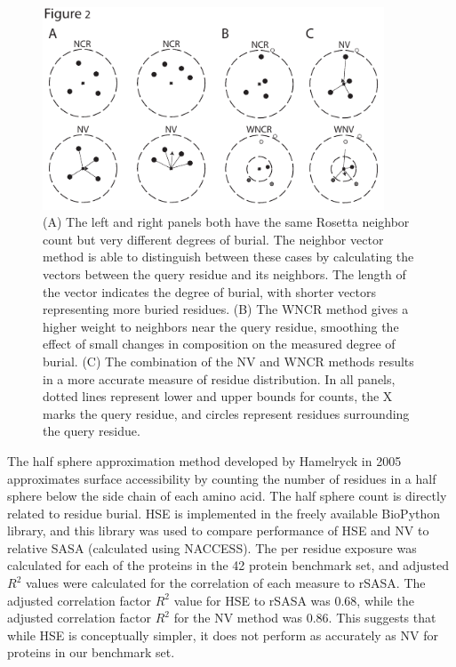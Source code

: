 \begin{figure}
\centering
\includegraphics[width=4in]{figures/nv_kbp/nv_schematic}
\caption{
(A) The left and right panels both have the same Rosetta neighbor count \citep{Dantas:2003vt} but very different degrees of burial.
The neighbor vector method is able to distinguish between these cases by calculating the vectors between the query residue and its neighbors.
The length of the vector indicates the degree of burial, with shorter vectors representing more buried residues. 
(B) The \acs{WNCR} method gives a higher weight to neighbors near the query residue, smoothing the effect of small changes in composition on the measured degree of burial. 
(C) The combination of the \acs{NV} and \acs{WNCR} methods results in a more accurate measure of residue distribution. 
In all panels, dotted lines represent lower and upper bounds for counts, the X marks the query residue, and circles represent residues surrounding the query residue.
}
\label{fig:nv_schematic}
\end{figure}

The half sphere approximation method developed by Hamelryck in 2005 \citep{Hamelryck:2005kt} approximates surface accessibility by counting the number of residues in a half sphere below the side chain of each amino acid.
The half sphere count is directly related to residue burial.
\ac{HSE} is implemented in the freely available BioPython library, and this library was used to compare performance of \ac{HSE} and \ac{NV} to relative \ac{SASA} (calculated using NACCESS).
The per residue exposure was calculated for each of the proteins in the 42 protein benchmark set, and adjusted $R^{2}$ values were calculated for the correlation of each measure to \ac{rSASA}.
The adjusted correlation factor $R^{2}$ value for \ac{HSE} to \ac{rSASA} was 0.68, while the adjusted correlation factor $R^{2}$ for the \ac{NV} method was 0.86.
This suggests that while \ac{HSE} is conceptually simpler, it does not perform as accurately as \ac{NV} for proteins in our benchmark set.

